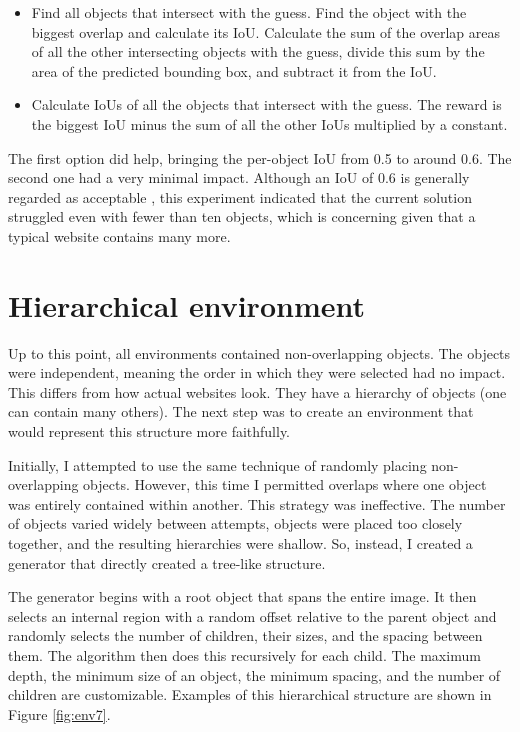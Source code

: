 \documentclass[
  digital,     %
  oneside,     %
  nosansbold,  %
  nocolorbold, %
  lof,         %
  lot,         %
]{fithesis4}
\begin{document}
\begin{itemize}
    \item Find all objects that intersect with the guess. Find the object with the biggest overlap and calculate its IoU. Calculate the sum of the overlap areas of all the other intersecting objects with the guess, divide this sum by the area of the predicted bounding box, and subtract it from the IoU.
    \item Calculate IoUs of all the objects that intersect with the guess. The reward is the biggest IoU minus the sum of all the other IoUs multiplied by a constant.
\end{itemize}

The first option did help, bringing the per-object IoU from 0.5 to around 0.6. The second one had a very minimal impact. Although an IoU of 0.6 is generally regarded as acceptable \cite{DLforVisualSystems}, this experiment indicated that the current solution struggled even with fewer than ten objects, which is concerning given that a typical website contains many more.

\section{Hierarchical environment}
\label{sec:hierarchical-env}

Up to this point, all environments contained non-overlapping objects. The objects were independent, meaning the order in which they were selected had no impact. This differs from how actual websites look. They have a hierarchy of objects (one can contain many others). The next step was to create an environment that would represent this structure more faithfully.

Initially, I attempted to use the same technique of randomly placing non-overlapping objects. However, this time I permitted overlaps where one object was entirely contained within another. This strategy was ineffective. The number of objects varied widely between attempts, objects were placed too closely together, and the resulting hierarchies were shallow. So, instead, I created a generator that directly created a tree-like structure.

The generator begins with a root object that spans the entire image. It then selects an internal region with a random offset relative to the parent object and randomly selects the number of children, their sizes, and the spacing between them. The algorithm then does this recursively for each child. The maximum depth, the minimum size of an object, the minimum spacing, and the number of children are customizable. Examples of this hierarchical structure are shown in Figure \ref{fig:env7}.
\end{document}
